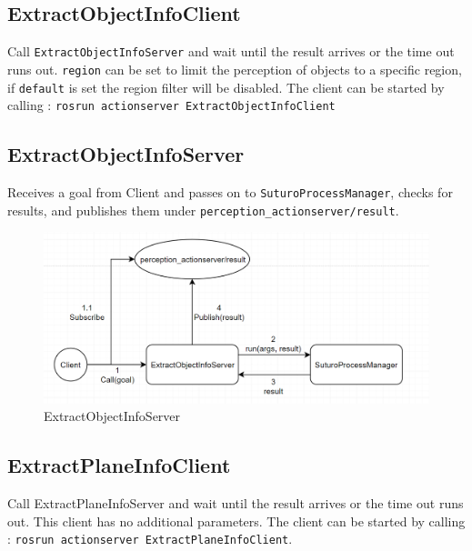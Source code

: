 \documentclass[main.tex]{subfiles}
\begin{document}
			\subsection{ExtractObjectInfoClient}
Call \texttt{ExtractObjectInfoServer} and wait until the result arrives or the time out runs out. \texttt{region} can be set to limit the perception of objects to a specific region, if \texttt{default} is set the region filter will be disabled. The client can be started by calling : \texttt{rosrun actionserver ExtractObjectInfoClient}

			\subsection{ExtractObjectInfoServer}
Receives a goal from Client and passes on to \texttt{SuturoProcessManager}, checks for results, and publishes them under \texttt{perception\_actionserver/result}. 
			\begin{figure}[H]
   			 \centering
    			 \includegraphics[width=1\textwidth]{pictures/perception/suturo_ExtractObjectInfoServer.png}
   			 \caption{ExtractObjectInfoServer}
  			\end{figure}

			\subsection{ExtractPlaneInfoClient}
Call ExtractPlaneInfoServer and wait until the result arrives or the time out runs out. This client has no additional parameters.
The client can be started by calling : \texttt{rosrun actionserver ExtractPlaneInfoClient}.
\end{document}
